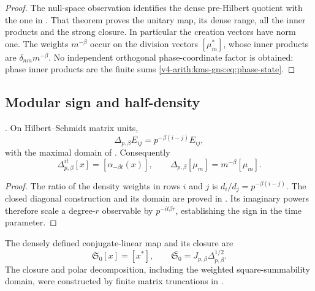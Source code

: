 \begin{proof}
The null-space observation identifies the dense pre-Hilbert
quotient with the one in .
That theorem proves the unitary map, its dense range, all the
inner products and the strong closure. In particular the creation
vectors have norm one. The weights $m^{-\beta}$ occur on the
division vectors $[\mu_m^*]$, whose inner products are
$\delta_{nm}m^{-\beta}$. No independent orthogonal phase-coordinate
factor is obtained: phase inner products are the finite sums
\eqref{v4-arith:kms-gns:eq:phase-state}.
\end{proof}

\subsection{Modular sign and half-density}
\label{v4-arith:kms-gns:cycle1:modular}

\begin{lemma}
\label{v4-arith:kms-gns:lem:Delta}
\ClaimStatusProvedHere. On Hilbert--Schmidt matrix units,
\begin{equation}
 \Delta_{p,\beta}E_{ij}=p^{-\beta(i-j)}E_{ij},
 \label{v4-arith:kms-gns:eq:Delta-basis}
\end{equation}
with the maximal domain of .
Consequently
\begin{equation}
 \Delta_{p,\beta}^{it}[x]=[\alpha_{-\beta t}(x)],
 \qquad \Delta_{p,\beta}[\mu_m]=m^{-\beta}[\mu_m].
 \label{v4-arith:kms-gns:eq:Delta-formula}
\end{equation}
\end{lemma}

\begin{proof}
The ratio of the density weights in rows $i$ and $j$ is
$d_i/d_j=p^{-\beta(i-j)}$. The closed diagonal construction and
its domain are proved in . Its
imaginary powers therefore scale a degree-$r$ observable by
$p^{-it\beta r}$, establishing the sign in the time parameter.
\end{proof}

The densely defined conjugate-linear map and its closure are
\begin{equation}
 \mathfrak S_0[x]=[x^*],\qquad
 \overline{\mathfrak S_0}=J_{p,\beta}\Delta_{p,\beta}^{1/2}.
 \label{v4-arith:kms-gns:eq:S-def}
\end{equation}
The closure and polar decomposition, including the weighted
square-summability domain, were constructed by finite matrix
truncations in .

